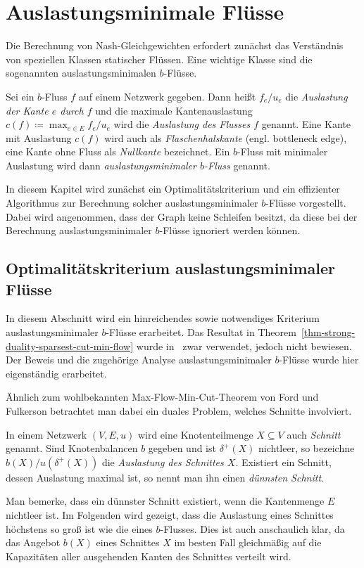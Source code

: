 \chapter{Auslastungsminimale Flüsse}\label{chapter-min-con-flows}

Die Berechnung von Nash-Gleichgewichten erfordert zunächst das Verständnis von speziellen Klassen statischer Flüssen.
Eine wichtige Klasse sind die sogenannten auslastungsminimalen $b$-Flüsse.

\begin{definition}
	Sei ein $b$-Fluss $f$ auf einem Netzwerk gegeben.
	Dann heißt $f_e/u_e$ die \emph{Auslastung der Kante $e$ durch $f$} und die maximale Kantenauslastung $c(f)\coloneq \max_{e\in E} f_e/u_e$ wird die \emph{Auslastung des Flusses $f$} genannt.
	Eine Kante mit Auslastung $c(f)$ wird auch als \emph{Flaschenhalskante} (engl. bottleneck edge), eine Kante ohne Fluss als \emph{Nullkante} bezeichnet.
	Ein $b$-Fluss mit minimaler Auslastung wird dann \emph{auslastungsminimaler $b$-Fluss} genannt.
\end{definition}

In diesem Kapitel wird zunächst ein Optimalitätskriterium und ein effizienter Algorithmus zur Berechnung solcher auslastungsminimaler $b$-Flüsse vorgestellt.
Dabei wird angenommen, dass der Graph keine Schleifen besitzt, da diese bei der Berechnung auslastungsminimaler $b$-Flüsse ignoriert werden können.

\section{Optimalitätskriterium auslastungsminimaler Flüsse}

In diesem Abschnitt wird ein hinreichendes sowie notwendiges Kriterium auslastungsminimaler $b$-Flüsse erarbeitet.
Das Resultat in Theorem~\ref{thm-strong-duality-sparsest-cut-min-flow} wurde in~\cite[Theorem 6.11]{Koch2012} zwar verwendet, jedoch nicht bewiesen.
Der Beweis und die zugehörige Analyse auslastungsminimaler $b$-Flüsse wurde hier eigenständig erarbeitet.

Ähnlich zum wohlbekannten Max-Flow-Min-Cut-Theorem von Ford und Fulkerson betrachtet man dabei ein duales Problem, welches Schnitte involviert.

\begin{definition}
	In einem Netzwerk $(V, E, u)$ wird eine Knotenteilmenge $X\subseteq V$ auch \emph{Schnitt} genannt.
	Sind Knotenbalancen $b$ gegeben und ist $\delta^+(X)$ nichtleer, so bezeichne $b(X) / u(\delta^+(X))$ die \emph{Auslastung des Schnittes $X$}.
	Existiert ein Schnitt, dessen Auslastung maximal ist, so nennt man ihn einen \emph{dünnsten Schnitt}.
\end{definition}
Man bemerke, dass ein dünnster Schnitt existiert, wenn die Kantenmenge $E$ nichtleer ist.
Im Folgenden wird gezeigt, dass die Auslastung eines Schnittes höchstens so groß ist wie die eines $b$-Flusses.
Dies ist auch anschaulich klar, da das Angebot $b(X)$ eines Schnittes $X$ im besten Fall gleichmäßig auf die Kapazitäten aller ausgehenden Kanten des Schnittes verteilt wird.


